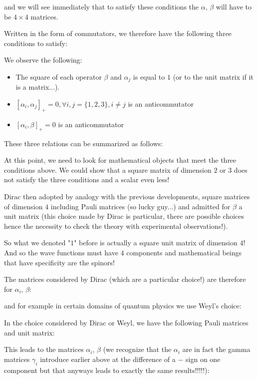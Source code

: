 	and we will see immediately that to satisfy these conditions the $\alpha$, $\beta$ will have to be $4\times 4$ matrices.

	Written in the form of commutators, we therefore have the following three conditions to satisfy:
	
	We observe the following:
	\begin{itemize}
		\item The square of each operator $\beta$ and $\alpha_j$ is equal to $1$ (or to the unit matrix if it is a matrix...).

		\item $\left[\alpha_i,\alpha_j\right]_{+}=0,\forall i,j=\{1,2,3\},i\neq j$ is an anticommutator

		\item $\left[\alpha_i,\beta\right]_{+}=0$ is an anticommutator
	\end{itemize}
	These three relations can be summarized as follows:
	
	At this point, we need to look for mathematical objects that meet the three conditions above. We could show that a square matrix of dimension $2$ or $3$ does not satisfy the three conditions and a scalar even less!

	Dirac then adopted by analogy with the previous developments, square matrices of dimension $4$ including Pauli matrices (so lucky guy...) and admitted for $\beta$ a unit matrix (this choice made by Dirac is particular, there are possible choices hence the necessity to check the theory with experimental observations!).

	So what we denoted "$1$" before is actually a square unit matrix of dimension $4$! And so the wave functions must have $4$ components and mathematical beings that have specificity are the spinors!

	The matrices considered by Dirac (which are a particular choice!) are therefore for $\alpha_i$, $\beta$:
	
	and for example in certain domains of quantum physics we use Weyl's choice:
	
	In the choice considered by Dirac or Weyl, we have the following Pauli matrices and unit matrix:
	
	This leads to the matrices $\alpha_i$, $\beta$ (we recognize that the $\alpha_i$ are in fact the gamma matrices $\gamma_i$ introduce earlier above at the difference of a $-$ sign on one component but that anyways leads to exactly the same results!!!!!):
	
